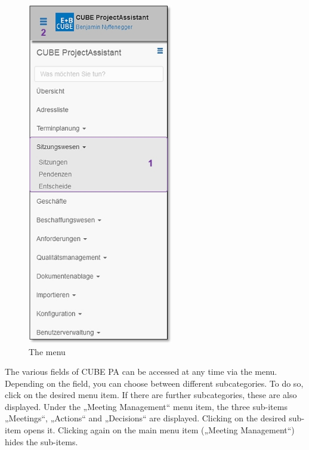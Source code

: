 \begin{figure}   %
  \vspace{-25pt}      %
  \begin{center}
    \includegraphics[height=150mm]{../chapters/01_Einfuehrung/pictures/1-3-1_Menuuebersicht_oSitzungswesen.jpg}
  \end{center}
  \vspace{-20pt}
  \caption{The menu}
  \vspace{-10pt}
\end{figure}
The various fields of CUBE PA can be accessed at any time via the menu. Depending on the field, you can choose between different subcategories. To do so, click on the desired menu item. If there are further subcategories, these are also displayed. Under the „Meeting Management“  menu item, the three sub-items „Meetings“, „Actions“ and „Decisions“ are displayed. Clicking on the desired sub-item opens it. Clicking again on the main menu item („Meeting Management“) hides the sub-items.

\vspace{\baselineskip}

